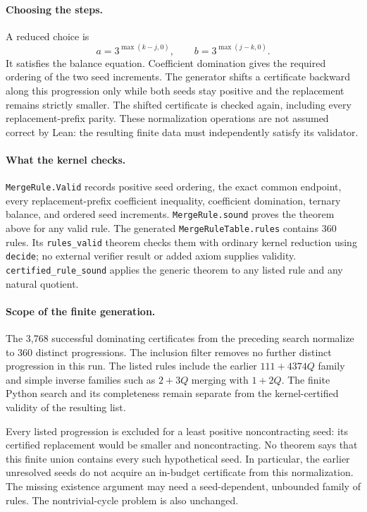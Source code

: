 \documentclass[10pt]{article}
\begin{document}
\paragraph{Choosing the steps.}
A reduced choice is
\[
a=3^{\max(k-j,0)},\qquad b=3^{\max(j-k,0)}.
\]
It satisfies the balance equation. Coefficient domination gives the
required ordering of the two seed increments. The generator shifts a
certificate backward along this progression only while both seeds stay
positive and the replacement remains strictly smaller. The shifted
certificate is checked again, including every replacement-prefix parity.
These normalization operations are not assumed correct by Lean: the
resulting finite data must independently satisfy its validator.

\paragraph{What the kernel checks.}
\texttt{MergeRule.Valid} records positive seed ordering, the exact common
endpoint, every replacement-prefix coefficient inequality, coefficient
domination, ternary balance, and ordered seed increments.
\texttt{MergeRule.sound} proves the theorem above for any valid rule.
The generated \texttt{MergeRuleTable.rules} contains 360 rules. Its
\texttt{rules\_valid} theorem checks them with ordinary kernel reduction
using \texttt{decide}; no external verifier result or added axiom supplies
validity. \texttt{certified\_rule\_sound} applies the generic theorem to
any listed rule and any natural quotient.

\paragraph{Scope of the finite generation.}
The 3,768 successful dominating certificates from the preceding search
normalize to 360 distinct progressions. The inclusion filter removes
no further distinct progression in this run. The listed rules include
the earlier $111+4374Q$ family and simple inverse families such as
$2+3Q$ merging with $1+2Q$. The finite Python search and its completeness
remain separate from the kernel-certified validity of the resulting list.

Every listed progression is excluded for a least positive noncontracting
seed: its certified replacement would be smaller and noncontracting.
No theorem says that this finite union contains every such hypothetical
seed. In particular, the earlier unresolved seeds do not acquire an
in-budget certificate from this normalization. The missing existence
argument may need a seed-dependent, unbounded family of rules. The
nontrivial-cycle problem is also unchanged.
\end{document}
